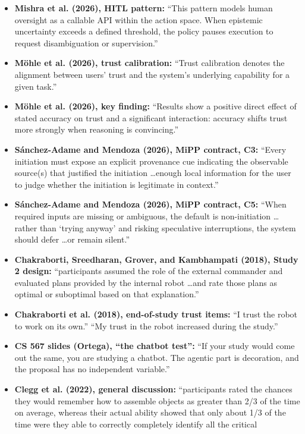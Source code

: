 \documentclass[9pt,conference]{IEEEtran}
\begin{document}
\begin{itemize}
\item \textbf{Mishra et al. (2026), HITL pattern:} ``This pattern
  models human oversight as a callable API within the action space.
  When epistemic uncertainty exceeds a defined threshold, the policy
  pauses execution to request disambiguation or supervision.''
\item \textbf{Möhle et al. (2026), trust calibration:} ``Trust
  calibration denotes the alignment between users' trust and the
  system's underlying capability for a given task.''
\item \textbf{Möhle et al. (2026), key finding:} ``Results show a
  positive direct effect of stated accuracy on trust and a
  significant interaction: accuracy shifts trust more strongly when
  reasoning is convincing.''
\item \textbf{Sánchez-Adame and Mendoza (2026), MiPP contract, C3:}
  ``Every initiation must expose an explicit provenance cue
  indicating the observable source(s) that justified the initiation
  \ldots enough local information for the user to judge whether the
  initiation is legitimate in context.''
\item \textbf{Sánchez-Adame and Mendoza (2026), MiPP contract, C5:}
  ``When required inputs are missing or ambiguous, the default is
  non-initiation \ldots rather than `trying anyway' and risking
  speculative interruptions, the system should defer \ldots or remain
  silent.''
\item \textbf{Chakraborti, Sreedharan, Grover, and Kambhampati
  (2018), Study 2 design:} ``participants assumed the role of the
  external commander and evaluated plans provided by the internal
  robot \ldots and rate those plans as optimal or suboptimal based on
  that explanation.''
\item \textbf{Chakraborti et al. (2018), end-of-study trust items:}
  ``I trust the robot to work on its own.'' ``My trust in the robot
  increased during the study.''
\item \textbf{CS 567 slides (Ortega), ``the chatbot test'':} ``If
  your study would come out the same, you are studying a chatbot. The
  agentic part is decoration, and the proposal has no independent
  variable.''
\item \textbf{Clegg et al. (2022), general discussion:}
  ``participants rated the chances they would remember how to
  assemble objects as greater than 2/3 of the time on average,
  whereas their actual ability showed that only about 1/3 of the time
  were they able to correctly completely identify all the critical

\end{itemize}
\end{document}
